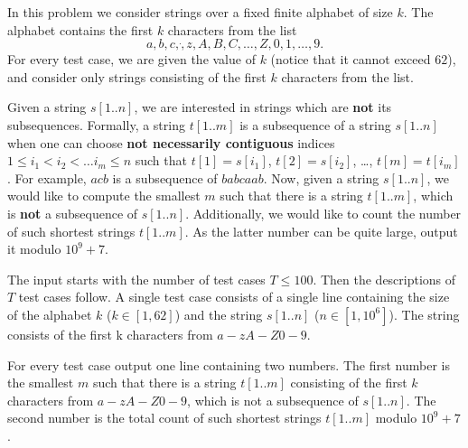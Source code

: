 In this problem we consider strings over a fixed finite alphabet of size $k$.
The alphabet contains the first $k$ characters from the list
$$a, b, c, \dot , z, A, B, C, \dots, Z, 0, 1, \dots, 9\text{.}$$
For every test case, we are given the value of $k$ (notice that it cannot exceed $62$), and consider only strings consisting of the first $k$ characters from the list.

Given a string $s[1..n]$, we are interested in strings which are \textbf{not} its subsequences.
Formally, a string $t[1..m]$ is a subsequence of a string $s[1..n]$ when one can choose \textbf{not necessarily contiguous} indices $1 \leq i_1 < i_2 < \dots i_m \leq n$ such that $t[1] = s[i_1]$, $t[2] = s[i_2]$, \dots, $t[m] = t[i_m]$.
For example, $acb$ is a subsequence of $babcaab$.
Now, given a string $s[1..n]$, we would like to compute the smallest $m$ such
that there is a string $t[1..m]$, which is \textbf{not} a subsequence of $s[1..n]$. Additionally, we would like to count the number of such shortest strings $t[1..m]$.
As the latter number can be quite large, output it modulo $10^9 + 7$.

\begin{Input}
    The input starts with the number of test cases $T \leq 100$.
    Then the descriptions of $T$ test cases follow.
    A single test case consists of a single line containing the size of the alphabet $k$ ($k \in [1, 62]$) and the string $s[1..n]$ ($n \in [1, 10^6]$).
    The string consists of the first k characters from $a-zA-Z0-9$.
\end{Input}

\begin{Output}
    For every test case output one line containing two numbers.
    The first number is the smallest $m$ such that there is a string $t[1..m]$ consisting of the first $k$ characters from $a-zA-Z0-9$, which is not a subsequence of $s[1..n]$.
    The second number is the total count of such shortest strings $t[1..m]$ modulo $10^9 + 7$.
\end{Output}

